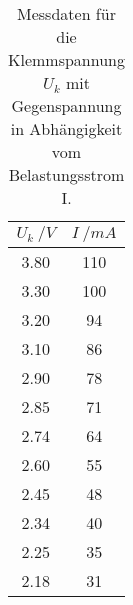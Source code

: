 \begin{table}[H]
  \centering
   \begin{tabular}{c c}
    \toprule
    $ U_{k} \: /V$ & $ I \: /mA $ \\
    \midrule
    3.80 & 110 \\
    3.30 & 100 \\
    3.20 & 94 \\
    3.10 & 86 \\
    2.90 & 78 \\
    2.85 & 71 \\
    2.74 & 64 \\
    2.60 & 55 \\
    2.45 & 48 \\
    2.34 & 40 \\
    2.25 & 35 \\
    2.18 & 31 \\
    \bottomrule
  \end{tabular}
  \caption{Messdaten für die Klemmspannung $U_{k}$ mit Gegenspannung in Abhängigkeit vom Belastungsstrom I.}
  \label{tab:tabelle2}
\end{table}
